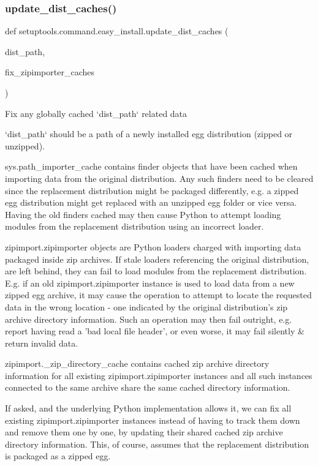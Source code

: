 \subsubsection{\texorpdfstring{update\+\_\+dist\+\_\+caches()}{update\_dist\_caches()}}
{\footnotesize\ttfamily def setuptools.\+command.\+easy\+\_\+install.\+update\+\_\+dist\+\_\+caches (\begin{DoxyParamCaption}\item[{}]{dist\+\_\+path,  }\item[{}]{fix\+\_\+zipimporter\+\_\+caches }\end{DoxyParamCaption})}

\begin{DoxyVerb}Fix any globally cached `dist_path` related data

`dist_path` should be a path of a newly installed egg distribution (zipped
or unzipped).

sys.path_importer_cache contains finder objects that have been cached when
importing data from the original distribution. Any such finders need to be
cleared since the replacement distribution might be packaged differently,
e.g. a zipped egg distribution might get replaced with an unzipped egg
folder or vice versa. Having the old finders cached may then cause Python
to attempt loading modules from the replacement distribution using an
incorrect loader.

zipimport.zipimporter objects are Python loaders charged with importing
data packaged inside zip archives. If stale loaders referencing the
original distribution, are left behind, they can fail to load modules from
the replacement distribution. E.g. if an old zipimport.zipimporter instance
is used to load data from a new zipped egg archive, it may cause the
operation to attempt to locate the requested data in the wrong location -
one indicated by the original distribution's zip archive directory
information. Such an operation may then fail outright, e.g. report having
read a 'bad local file header', or even worse, it may fail silently &
return invalid data.

zipimport._zip_directory_cache contains cached zip archive directory
information for all existing zipimport.zipimporter instances and all such
instances connected to the same archive share the same cached directory
information.

If asked, and the underlying Python implementation allows it, we can fix
all existing zipimport.zipimporter instances instead of having to track
them down and remove them one by one, by updating their shared cached zip
archive directory information. This, of course, assumes that the
replacement distribution is packaged as a zipped egg.


\end{DoxyVerb}
